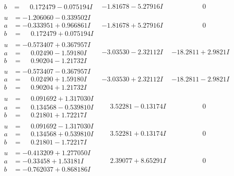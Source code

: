 \documentclass[1p]{elsarticle_modified}
\theoremstyle{definition}
\begin{document}
$$\begin{array}{c|c|c}
\begin{aligned}
b &= \phantom{-}0.172479 - 0.075194 I\end{aligned}
 & -1.81678 - 5.27916 I & \phantom{-0.000000 } 0 \\ \hline\begin{aligned}
u &= -1.206060 - 0.339502 I \\
a &= -0.333951 + 0.966861 I \\
b &= \phantom{-}0.172479 + 0.075194 I\end{aligned}
 & -1.81678 + 5.27916 I & \phantom{-0.000000 } 0 \\ \hline\begin{aligned}
u &= -0.573407 + 0.367957 I \\
a &= \phantom{-}0.02490 - 1.59180 I \\
b &= \phantom{-}0.90204 - 1.21732 I\end{aligned}
 & -3.03530 - 2.32112 I & -18.2811 + 2.9821 I \\ \hline\begin{aligned}
u &= -0.573407 - 0.367957 I \\
a &= \phantom{-}0.02490 + 1.59180 I \\
b &= \phantom{-}0.90204 + 1.21732 I\end{aligned}
 & -3.03530 + 2.32112 I & -18.2811 - 2.9821 I \\ \hline\begin{aligned}
u &= \phantom{-}0.091692 + 1.317030 I \\
a &= \phantom{-}0.134568 - 0.539810 I \\
b &= \phantom{-}0.21801 + 1.72217 I\end{aligned}
 & \phantom{-}3.52281 - 0.13174 I & \phantom{-0.000000 } 0 \\ \hline\begin{aligned}
u &= \phantom{-}0.091692 - 1.317030 I \\
a &= \phantom{-}0.134568 + 0.539810 I \\
b &= \phantom{-}0.21801 - 1.72217 I\end{aligned}
 & \phantom{-}3.52281 + 0.13174 I & \phantom{-0.000000 } 0 \\ \hline\begin{aligned}
u &= -0.413209 + 1.277050 I \\
a &= -0.33458 + 1.53181 I \\
b &= -0.762037 + 0.868186 I\end{aligned}
 & \phantom{-}2.39077 + 8.65291 I & \phantom{-0.000000 } 0 \\ \hline\begin{aligned}

\end{aligned}
\end{array}$$
\end{document}
